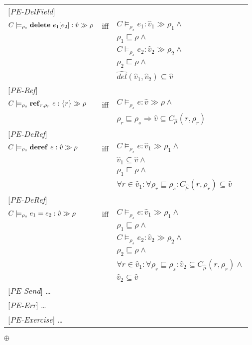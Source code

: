 \documentclass[[12pt,a4paper,twoside,openrigh]{article}
\newcommand{\vat}[0]{\hat{v}}
\newcommand{\modelrho}{\models_{\rho_s}}
\newcommand{\caesti}[2]{C \modelrho #1 : \vat_{#2} \gg \rho_{#2}}
\newcommand{\caest}[1]{C \modelrho #1 : \vat \gg \rho}
\begin{document}
\begin{tabular} {l l l}
{[\textit{PE-DelField}]}\\
$\caest {\delete {e_1} {e_2}} $& iff &$ \caesti {e_1} {1} \wedge $\\
&& $\rho_1 \sqsubseteq \rho \wedge$ \\
&& $ \caesti {e_2} {2} \wedge $ \\
&& $\rho_2 \sqsubseteq \rho \wedge$ \\
&& $\widehat{del} (\vat_1, \vat_2) \subseteq \vat$\\
{[\textit{PE-Ref}]}\\
$ C \modelrho \newref {r,\rho_r} {e} :\{r\} \gg \rho $& iff &$ \caest {e} \wedge $\\
&& $\rho_r \sqsubseteq \rho_s \Rightarrow \vat \subseteq C_{\hat{\mu}}(r, \rho_r) $ \\
{[\textit{PE-DeRef}]}\\
$\caest {\deref {e}} $& iff &$ \caesti {e} {1} \wedge $\\
&& $\vat_1 \subseteq \vat \wedge$ \\
&& $\rho_1 \sqsubseteq \rho \wedge$ \\
&& $\forall r \in \vat_1 : \forall \rho_r \sqsubseteq \rho_s : C_{\hat{\mu}}(r, \rho_r) \subseteq \vat$ \\
{[\textit{PE-DeRef}]}\\
$\caest {\setref {e_1} {e_2}} $& iff &$ \caesti {e} {1} \wedge $\\
&& $\rho_1 \sqsubseteq \rho \wedge$ \\
&& $ \caesti {e_2} {2} \wedge $ \\
&& $\rho_2 \sqsubseteq \rho \wedge$ \\
&& $\forall r \in \vat_1 : \forall \rho_r \sqsubseteq \rho_s : \vat_2 \subseteq C_{\hat{\mu}}(r, \rho_r) \wedge$ \\
&& $\vat_2 \subseteq \vat $ \\
{[\textit{PE-Send}]} \dots \\
{[\textit{PE-Err}]} \dots \\
{[\textit{PE-Exercise}]} \dots \\
\end{tabular}

$\oplus$

% 
\end{document}
